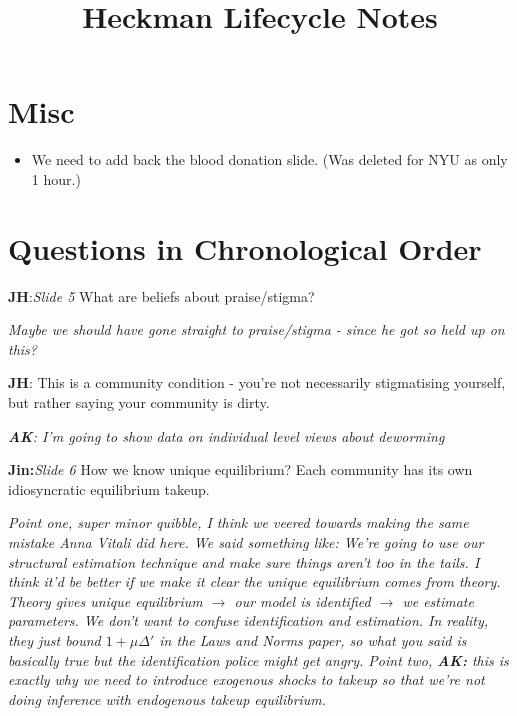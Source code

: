 \documentclass{article}
\title{Heckman Lifecycle Notes}
\begin{document}
\maketitle

\section*{Misc}


\begin{itemize}
    \item We need to add back the blood donation slide. (Was deleted for NYU as only 1 hour.)
\end{itemize}

\section{Questions in Chronological Order}



\textbf{JH}:\emph{Slide 5} What are beliefs about praise/stigma?

\emph{
    Maybe we should have gone straight to praise/stigma - since he got so held up on 
    this?
}
\newline
\newline

\textbf{JH}: This is a community condition - you're not necessarily stigmatising 
yourself, but rather saying your community is dirty.

\emph{\textbf{AK}: I'm going to show data on individual level views about deworming}
\newline 
\newline

\textbf{Jin:}\emph{Slide 6} How we know unique equilibrium? Each community has 
its own idiosyncratic equilibrium takeup.

\emph{
Point one, super minor quibble, I think we veered towards making the same mistake Anna Vitali did here. We said something 
like: We're going to use our structural estimation technique and make sure things aren't too 
in the tails.
I think it'd be better if we make it clear the unique equilibrium comes from theory.
Theory gives unique equilibrium $\rightarrow$ our model is identified $\rightarrow$ we estimate parameters.
We don't want to confuse identification and estimation. In reality, they just bound 
$1 + \mu \Delta'$ in the Laws and Norms paper, so what you said is basically true but 
the identification police might get angry.
Point two, \textbf{AK:} this is exactly why we need to introduce exogenous shocks to takeup 
so that we're not doing inference with endogenous takeup equilibrium.
}
\newline
\newline
\end{document}
